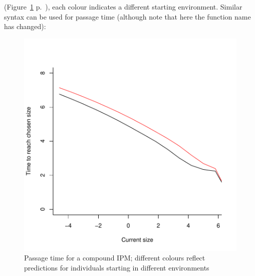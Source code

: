 \documentclass{article}
\begin{document}
(Figure~\ref{fig:five} p.~\pageref{fig:five}), 
each colour indicates a different starting environment. Similar syntax can be used for passage time (although note that here the function name has changed): 
\begin{figure}
\begin{center}
\includegraphics{IPMpack_Vignette-fig5}
\end{center}
\caption{Passage time for a compound IPM;   different colours reflect predictions for individuals starting in different environments}
\label{fig:five}
\end{figure}
\end{document}
